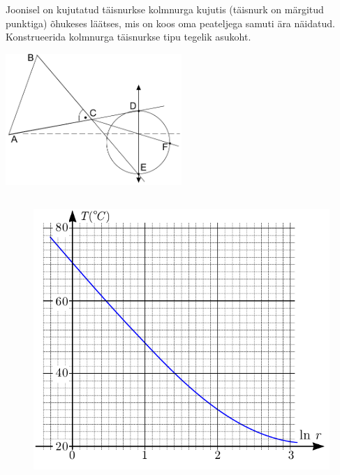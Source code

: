 \documentclass[10pt]{article}
\begin{document}

Joonisel on kujutatud täisnurkse kolmnurga kujutis (täisnurk on märgitud punktiga) õhukeses läätses, mis on koos oma peateljega samuti ära näidatud. Konstrueerida kolmnurga täisnurkse tipu tegelik asukoht.
\begin{center}
	\includegraphics[width = 0.5\textwidth]{2018-lahg-08-yl.pdf}
\end{center}
\probend
\bigskip
\newpage\subsection{\protect{}}


\begin{figure}
	\vspace{-20pt}
	\begin{center}
		\includegraphics[width = \linewidth]{2018-lahg-09-yl.pdf}
	\end{center}
\end{figure}
\end{document}
